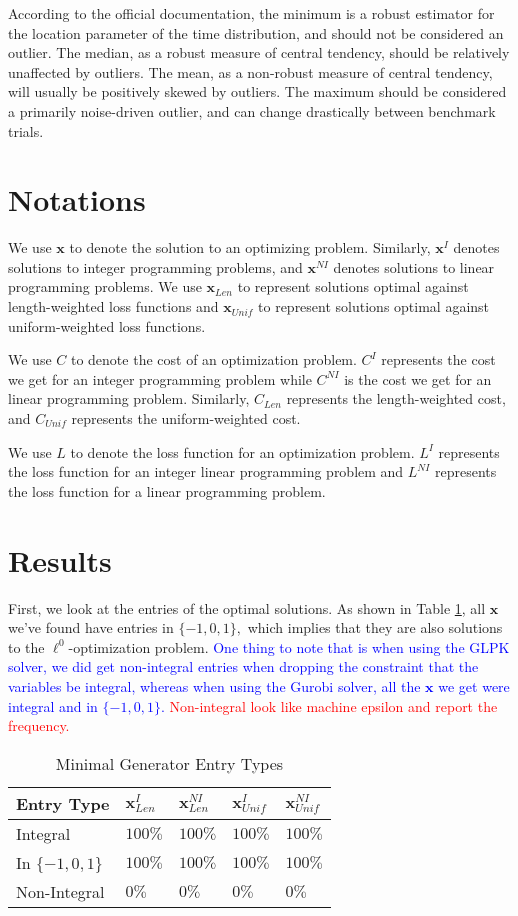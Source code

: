 \documentclass[11pt]{article}
\newcommand{\x}[0]{\mathbf{x}}
\begin{document}
According to the official documentation, 
the minimum is a robust estimator for the location parameter of the time distribution, and should not be considered an outlier.
The median, as a robust measure of central tendency, should be relatively unaffected by outliers.
The mean, as a non-robust measure of central tendency, will usually be positively skewed by outliers.
The maximum should be considered a primarily noise-driven outlier, and can change drastically between benchmark trials.

\section{Notations}
We use $\x$ to denote the solution to an optimizing problem. Similarly, $\x^I$ denotes solutions to integer programming problems, and $\x^{NI}$ denotes solutions to linear programming problems. We use $\x_{Len}$ to represent solutions optimal against length-weighted loss functions and $\x_{Unif}$ to represent solutions optimal against uniform-weighted loss functions. 

We use $C$ to denote the cost of an optimization problem. $C^I$ represents the cost we get for an integer programming problem while $C^{NI}$ is the cost we get for an linear programming problem. Similarly, $C_{Len}$ represents the length-weighted cost, and $C_{Unif}$ represents the uniform-weighted cost. 

We use $L$ to denote the loss function for an optimization problem. $L^I$ represents the loss function for an integer linear programming problem and $L^{NI}$ represents the loss function for a linear programming problem.
\section{Results}

First, we look at the entries of the optimal solutions. As shown in Table \ref{tab:entry}, all $\x$ we've found have entries in $\{-1, 0, 1\},$ which implies that they are also solutions to the $\ell^0$-optimization problem. \textcolor{blue}{One thing to note that is when using the GLPK solver, we did get non-integral entries when dropping the constraint that the variables be integral, whereas when using the Gurobi solver, all the $\x$ we get were integral and in $\{-1, 0, 1\}.$ } \textcolor{red}{Non-integral look like machine epsilon and report the frequency. }
\begin{table}[!h]
    \centering
\begin{tabular}{
|p{2.3cm}||p{2cm}|p{2cm}|p{2cm}|p{2cm}|}
 \hline
 Entry Type & $\x^I_{Len}$ & $\x^{NI}_{Len}$ & $\x^I_{Unif}$ & $\x^{NI}_{Unif}$\\
 \hline
 Integral  & $100\%$    &$100\%$&   $100\%$ & $100\%$\\
 In $\{-1,0,1\}$&   $100\%$  & $100\%$   &$100\%$ & $100\%$\\
 Non-Integral & $0\%$ & $0\%$&  $0\%$ & $0\%$ \\
 \hline
\end{tabular}
\caption{Minimal Generator Entry Types}
\label{tab:entry}
\end{table}
\end{document}
